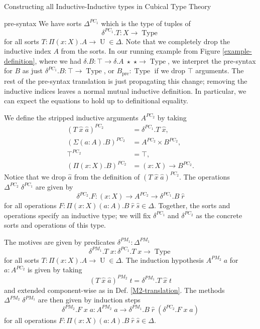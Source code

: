 \documentclass[runningheads]{llncs}
\DeclareMathOperator{\USet}{Type}
\DeclareMathOperator{\UU}{U}
\newcommand{\pre}[1]{{#1}_\text{pre}}
\begin{document}
{\begin{section}{Constructing all Inductive-Inductive types in Cubical Type Theory}
\begin{subsection}{pre-syntax}
We have sorts $\Delta^{PC_1}$ which is the type of tuples of \[\delta^{PC_1}.T : X \to \USet\] for all sorts $T : \Pi(x : X).A\to\UU \in\Delta$. Note that we completely drop the inductive index $A$ from the sorts. In our running example from Figure \ref{example-definition}, where we had $\delta.B : \top \to \delta.A\;\star\;\star \to \USet$, we interpret the pre-syntax for $B$ as just $\delta^{PC_1}.B : \top \to \USet$, or $\pre{B} : \USet$ if we drop $\top$ arguments. The rest of the pre-syntax translation is just propagating this change; removing the inductive indices leaves a normal mutual inductive definition. In particular, we can expect the equations to hold up to definitional equality.

We define the stripped inductive arguments $A^{PC_2}$ by taking
\begin{align*}
(T\;\hat{x}\;\hat{a})^{PC_2} &= \delta^{PC_1}.T\;\hat{x},\\
(\Sigma(a : A).B)^{PC_2} &= A^{PC_2}\times B^{PC_2},\\
\top^{PC_2} &= \top,\\
(\Pi(x : X).B)^{PC_2} &= (x : X) \to B^{PC_2}.
\end{align*} Notice that we drop $\hat{a}$ from the definition of $(T\;\hat{x}\;\hat{a})^{PC_2}$.
The operations $\Delta^{PC_2}\;\delta^{PC_1}$ are given by \[\delta^{PC_2}.F : (x : X) \to A^{PC_2} \to \delta^{PC_1}.B\;\hat{r}\] for all operations $F : \Pi(x : X)(a : A).B\;\hat{r}\;\hat{s} \in \Delta$. Together, the sorts and operations specify an inductive type; we will fix $\delta^{PC_1}$ and $\delta^{PC_2}$ as the concrete sorts and operations of this type.

The motives are given by predicates $\delta^{PM_1} : \Delta^{PM_1}$ \[\delta^{PM_1}.T\;x : \delta^{PC_1}.T\;x\to \USet\] for all sorts $T : \Pi(x : X).A\to\UU \in\Delta$. The induction hypothesis $A^{PM_2}\;a$ for $a : A^{PC_2}$ is given by taking \[(T\;\hat{x}\;\hat{a})^{PM_2}\;t = \delta^{PM_1}.T\;\hat{x}\;t\] and extended component-wise as in Def. \ref{M2-translation}. The methods $\Delta^{PM_2}\;\delta^{PM_1}$ are then given by induction steps \[\delta^{PM_2}.F\;x\;a : A^{PM_2}\;a \to \delta^{PM_1}.B\;\hat{r}\;(\delta^{PC_2}.F\;x\;a)\] for all operations $F : \Pi(x : X)(a : A).B\;\hat{r}\;\hat{s} \in \Delta$.


\end{subsection}
\end{section}}
\end{document}
